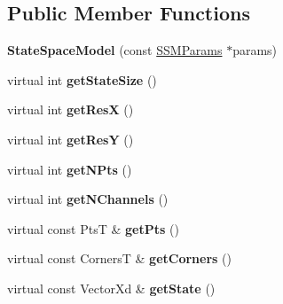 \subsection*{Public Member Functions}
\begin{DoxyCompactItemize}
\item 
\hypertarget{classStateSpaceModel_ae3038548df31d41994592d5e1fa55b70}{{\bfseries State\-Space\-Model} (const \hyperlink{structSSMParams}{S\-S\-M\-Params} $\ast$params)}\label{classStateSpaceModel_ae3038548df31d41994592d5e1fa55b70}

\item 
\hypertarget{classStateSpaceModel_af7538994ee27fdee4a6686430a1cb6b4}{virtual int {\bfseries get\-State\-Size} ()}\label{classStateSpaceModel_af7538994ee27fdee4a6686430a1cb6b4}

\item 
\hypertarget{classStateSpaceModel_a3875e11548ec9236bb203aee44b28070}{virtual int {\bfseries get\-Res\-X} ()}\label{classStateSpaceModel_a3875e11548ec9236bb203aee44b28070}

\item 
\hypertarget{classStateSpaceModel_aaea8e70981e9171f84ca45fc9a0cf6c1}{virtual int {\bfseries get\-Res\-Y} ()}\label{classStateSpaceModel_aaea8e70981e9171f84ca45fc9a0cf6c1}

\item 
\hypertarget{classStateSpaceModel_a27bb8ee1cb8f5883eedda9210d6cac73}{virtual int {\bfseries get\-N\-Pts} ()}\label{classStateSpaceModel_a27bb8ee1cb8f5883eedda9210d6cac73}

\item 
\hypertarget{classStateSpaceModel_abd541e8159bd2cb5cf77d8982b633794}{virtual int {\bfseries get\-N\-Channels} ()}\label{classStateSpaceModel_abd541e8159bd2cb5cf77d8982b633794}

\item 
\hypertarget{classStateSpaceModel_ad8acc900a157f2e0085ca0a2e4eb5d8f}{virtual const Pts\-T \& {\bfseries get\-Pts} ()}\label{classStateSpaceModel_ad8acc900a157f2e0085ca0a2e4eb5d8f}

\item 
\hypertarget{classStateSpaceModel_ac337b4e350ee3b35a55a6e717af10504}{virtual const Corners\-T \& {\bfseries get\-Corners} ()}\label{classStateSpaceModel_ac337b4e350ee3b35a55a6e717af10504}

\item 
\hypertarget{classStateSpaceModel_ae2494bbafef9a94228bd092899f0f22b}{virtual const Vector\-Xd \& {\bfseries get\-State} ()}\label{classStateSpaceModel_ae2494bbafef9a94228bd092899f0f22b}


\end{DoxyCompactItemize}
